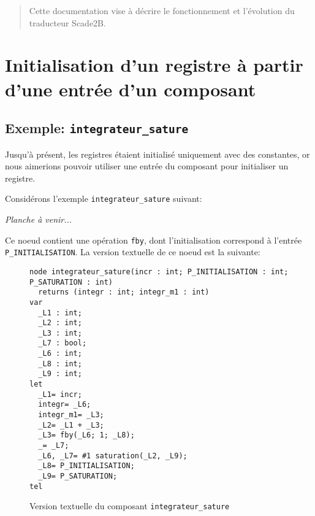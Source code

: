 \documentclass{cercles2}
\begin{document}
\maketitle

\tableofcontents

\begin{quote}
  Cette documentation vise à décrire le fonctionnement et l'évolution
  du traducteur Scade2B.
\end{quote}


\chapter{Initialisation d'un registre à partir d'une entrée d'un composant}

\section{Exemple: \texttt{integrateur\_sature}}

Jusqu'à présent, les registres étaient initialisé uniquement avec des
constantes, or nous aimerions pouvoir utiliser une entrée du composant
pour initialiser un registre.

Considérons l'exemple \texttt{integrateur\_sature} suivant:


\emph{Planche à venir...}

Ce noeud contient une opération \texttt{fby}, dont l'initialisation
correspond à l'entrée \texttt{P\_INITIALISATION}. La version textuelle
de ce noeud est la suivante:

\begin{figure}[h]
\label{fig:integ_sat_text}
\caption{Version textuelle du composant \texttt{integrateur\_sature}}
\begin{verbatim}
node integrateur_sature(incr : int; P_INITIALISATION : int; P_SATURATION : int)
  returns (integr : int; integr_m1 : int)
var
  _L1 : int;
  _L2 : int;
  _L3 : int;
  _L7 : bool;
  _L6 : int;
  _L8 : int;
  _L9 : int;
let
  _L1= incr;
  integr= _L6;
  integr_m1= _L3;
  _L2= _L1 + _L3;
  _L3= fby(_L6; 1; _L8);
  _= _L7;
  _L6, _L7= #1 saturation(_L2, _L9);
  _L8= P_INITIALISATION;
  _L9= P_SATURATION;
tel
\end{verbatim}
\end{figure}
\end{document}
